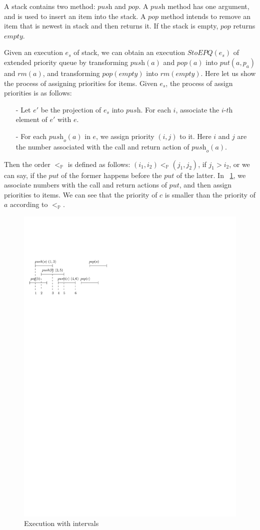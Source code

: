 A stack contains two method: $\textit{push}$ and $\textit{pop}$. A $\textit{push}$ method has one argument, and is used to insert an item into the stack. A $\textit{pop}$ method intends to remove an item that is newest in stack and then returns it. If the stack is empty, $\textit{pop}$ returns $\textit{empty}$.

Given an execution $e_s$ of stack, we can obtain an execution $\textit{StoEPQ}(e_s)$ of extended priority queue by transforming $\textit{push}(a)$ and $\textit{pop}(a)$ into $\textit{put}(a,p_a)$ and $\textit{rm}(a)$, and transforming $\textit{pop}(\textit{empty})$ into $\textit{rm}(\textit{empty})$. Here let us show the process of assigning priorities for items. Given $e_s$, the process of assign priorities is as follows: 

\begin{itemize}
\setlength{\itemsep}{0.5pt}
\item[-] Let $e'$ be the projection of $e_s$ into $\textit{push}$. For each $i$, associate the $\textit{i-th}$ element of $e'$ with $e$. 

\item[-] For each $\textit{push}_o(a)$ in $e$, we assign priority $(i,j)$ to it. Here $i$ and $j$ are the number associated with the call and return action of $\textit{push}_o(a)$. 
\end{itemize}  

Then the order $<_{\mathbb{P}}$ is defined as follows: $(i_1,i_2) <_{\mathbb{P}} (j_1,j_2)$, if $j_1 > i_2$, or we can say, if the $\textit{put}$ of the former happens before the $\textit{put}$ of the latter. In \figurename~\ref{fig:execution with intervals}, we associate numbers with the call and return actions of $\textit{put}$, and then assign priorities to items. We can see that the priority of $c$ is smaller than the priority of $a$ according to $<_{\mathbb{P}}$. 

\begin{figure}[htbp]
  \centering
  \includegraphics[width=0.6 \textwidth]{figures/PIC-HIS-INTRO-Interval.pdf}
  \caption{Execution with intervals}
  \label{fig:execution with intervals}
\end{figure}












